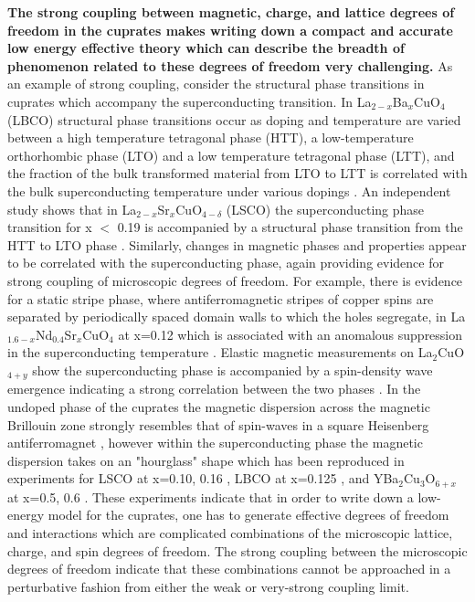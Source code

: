 \documentclass{article}
\begin{document}
\textbf{The strong coupling between magnetic, charge, and lattice degrees of freedom in the cuprates makes writing down a compact and accurate low energy effective theory which can describe the breadth of phenomenon related to these degrees of freedom very challenging.}
As an example of strong coupling, consider the structural phase transitions in cuprates which accompany the superconducting transition.
In La$_{2-x}$Ba$_x$CuO$_4$ (LBCO) structural phase transitions occur as doping and temperature are varied between a high temperature tetragonal phase (HTT), a low-temperature orthorhombic phase (LTO) and a low temperature tetragonal phase (LTT), and the fraction of the bulk transformed material from LTO to LTT is correlated with the bulk superconducting temperature under various dopings \cite{PhysRevLett.62.2751}. 
An independent study shows that in La$_{2-x}$Sr$_x$CuO$_{4-\delta}$ (LSCO) the superconducting phase transition for x $<$ 0.19 is accompanied by a structural phase transition from the HTT to LTO phase \cite{PhysRevB.35.7191}. 
Similarly, changes in magnetic phases and properties appear to be correlated with the superconducting phase, again providing evidence for strong coupling of microscopic degrees of freedom.
For example, there is evidence for a static stripe phase, where antiferromagnetic stripes of copper spins are separated by periodically spaced domain walls to which the holes segregate, in La$_{1.6-x}$Nd$_{0.4}$Sr$_x$CuO$_4$ at x=0.12 which is associated with an anomalous suppression in the superconducting temperature \cite{Tranquada1995, PhysRevB.54.7489}. 
Elastic magnetic measurements on La$_2$CuO$_{4+y}$ show the superconducting phase is accompanied by a spin-density wave emergence indicating a strong correlation between the two phases \cite{PhysRevB.60.3643}. 
In the undoped phase of the cuprates the magnetic dispersion across the magnetic Brillouin zone strongly resembles that of spin-waves in a square Heisenberg antiferromagnet \cite{PhysRevLett.104.077002, PhysRevLett.102.167401, PhysRevLett.105.157006}, however within the superconducting phase the magnetic dispersion takes on an "hourglass" shape which has been reproduced in experiments for LSCO at x=0.10, 0.16 \cite{PhysRevLett.93.147002}, LBCO at x=0.125 \cite{Tranquada2004}, and YBa$_2$Cu$_3$O$_{6+x}$ at x=0.5, 0.6 \cite{PhysRevB.71.024522, Hayden2004}. 
These experiments indicate that in order to write down a low-energy model for the cuprates, one has to generate effective degrees of freedom and interactions which are complicated combinations of the microscopic lattice, charge, and spin degrees of freedom.
The strong coupling between the microscopic degrees of freedom indicate that these combinations cannot be approached in a perturbative fashion from either the weak or very-strong coupling limit.
\end{document}
